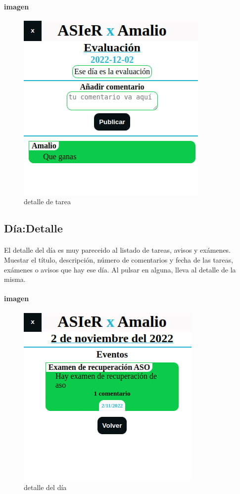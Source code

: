 \documentclass[a4paper]{article}
\begin{document}
\paragraph{imagen}
 \begin{figure}[ht]
    \includegraphics[scale=0.5]{./assets/tarea.jpg}
    \centering
    \caption{detalle de tarea}
    \label{fig:tarea}
 \end{figure}
 \newpage
 \subsection[/app/mes/dia]{Día:Detalle}
 \paragraph{}
 El detalle del día es muy pareceido al listado de tareas, avisos y exámenes.
 Muestar el título, descripción, número de comentarios y fecha de las tareas, exámenes o
  avisos que hay ese día. Al pulsar en alguna, lleva al detalle de la misma.
\paragraph{imagen}
 \begin{figure}[ht]
    \includegraphics[scale=0.5]{./assets/monthday.jpg}
    \centering
    \caption{detalle del día}
    \label{fig:dia}
 \end{figure}
 \newpage
\end{document}
